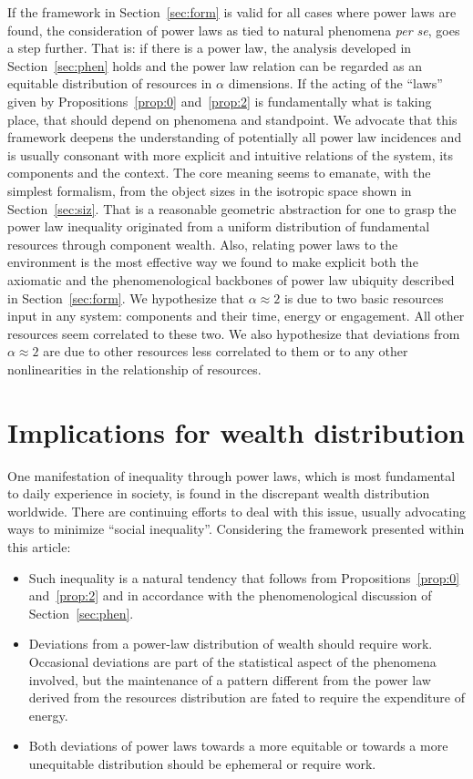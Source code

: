 \documentclass[a4paper, 11pt]{article} %
\begin{document}
If the framework in Section~\ref{sec:form} is valid for all cases where power laws are found,
the consideration of power laws as tied to natural phenomena \emph{per se}, goes a step further. 
That is: if there is
a power law, the analysis developed in Section~\ref{sec:phen} holds
and
the power law relation can be regarded as an equitable distribution
of resources in $\alpha$ dimensions.
If the acting of the ``laws'' given by Propositions~\ref{prop:0} and~\ref{prop:2} is fundamentally what is taking place, that should depend on phenomena
and standpoint.
We advocate that this framework deepens the understanding of potentially all power law
incidences and is usually consonant with more explicit and intuitive 
relations of the system, its components and the context.
The core meaning seems to emanate, with the simplest formalism, from
the object sizes in the isotropic space shown in Section~\ref{sec:siz}.
That is a reasonable geometric abstraction for
one to grasp the power law inequality originated from
a uniform distribution
of fundamental resources through component wealth.
Also, relating power laws to the environment is the most effective
way we found to make explicit both the axiomatic
and the phenomenological backbones of power law ubiquity described in
Section~\ref{sec:form}.
We hypothesize that $\alpha \approx 2$ is due to two basic resources
input in any system: components and their time, energy or engagement.
All other resources seem correlated to these two.
We also hypothesize that deviations from $\alpha \approx 2$ are due
to other resources less correlated to them
or to any other nonlinearities in the relationship of resources.

\section{Implications for wealth distribution}\label{sec:esp}

One manifestation of inequality through power laws,
which is most fundamental to daily experience
in society, is found in the discrepant wealth distribution worldwide.
There are continuing efforts to deal with this issue,
usually advocating ways to minimize ``social inequality''.
Considering the framework presented within this article:

\begin{itemize}
	\item Such inequality is a natural tendency that follows from Propositions~\ref{prop:0} and~\ref{prop:2} and in accordance with the phenomenological discussion of Section~\ref{sec:phen}.
	\item Deviations from a power-law distribution of wealth should require work.
		Occasional deviations are part of the statistical aspect of the phenomena involved, but the maintenance of a pattern different from the power law derived from the resources distribution are fated to require the expenditure of energy.
	\item Both deviations of power laws towards a more equitable or towards a more unequitable distribution should be ephemeral or require work.
\end{itemize}
\end{document}
